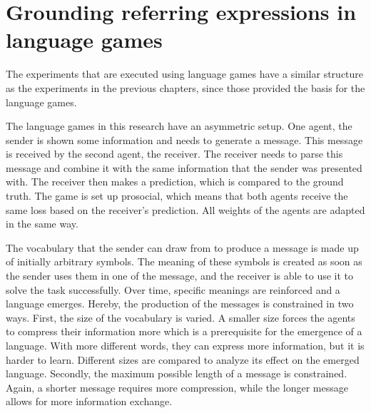 \section{Grounding referring expressions in language games}
\label{sec:language-games}
The experiments that are executed using language games have a similar structure as the experiments in the previous chapters, since those provided the basis for the language games.

The language games in this research have an asymmetric setup.
One agent, the sender is shown some information and needs to generate a message.
This message is received by the second agent, the receiver.
The receiver needs to parse this message and combine it with the same information that the sender was presented with.
The receiver then makes a prediction, which is compared to the ground truth.
The game is set up prosocial, which means that both agents receive the same loss based on the receiver's prediction.
All weights of the agents are adapted in the same way.

The vocabulary that the sender can draw from to produce a message is made up of initially arbitrary symbols.
The meaning of these symbols is created as soon as the sender uses them in one of the message, and the receiver is able to use it to solve the task successfully.
Over time, specific meanings are reinforced and a language emerges.
Hereby, the production of the messages is constrained in two ways.
First, the size of the vocabulary is varied.
A smaller size forces the agents to compress their information more which is a prerequisite for the emergence of a language.
With more different words, they can express more information, but it is harder to learn.
Different sizes are compared to analyze its effect on the emerged language.
Secondly, the maximum possible length of a message is constrained.
Again, a shorter message requires more compression, while the longer message allows for more information exchange.

